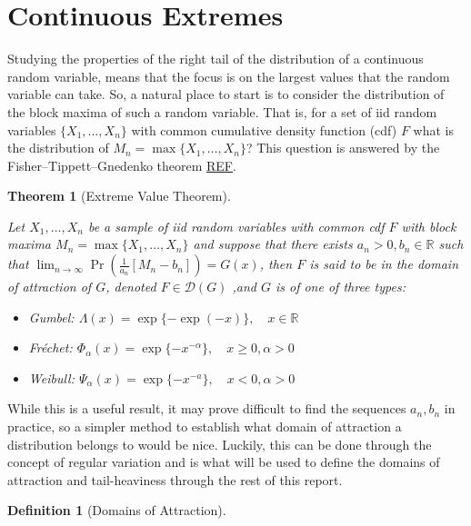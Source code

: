\documentclass[
  10pt,
  a4paper,
]{scrreprt}
\providecommand{\tightlist}{%
  \setlength{\itemsep}{0pt}\setlength{\parskip}{0pt}}\usepackage{longtable,booktabs,array}
\theoremstyle{definition}
\newtheorem{definition}{Definition}[section]
\theoremstyle{plain}
\newtheorem{theorem}{Theorem}[section]
\theoremstyle{remark}
\begin{document}
{\hypertarget{sec-ce}{%
\section{Continuous Extremes}\label{sec-ce}}

Studying the properties of the right tail of the distribution of a
continuous random variable, means that the focus is on the largest
values that the random variable can take. So, a natural place to start
is to consider the distribution of the block maxima of such a random
variable. That is, for a set of iid random variables
\(\{X_1,\ldots,X_n\}\) with common cumulative density function (cdf)
\(F\) what is the distribution of \(M_n = \max\{X_1,\ldots,X_n\}\)? This
question is answered by the Fisher--Tippett--Gnedenko theorem
\href{or\%20more\%20simply\%20the\%20extreme\%20value\%20theorem}{REF}.

\begin{theorem}[Extreme Value
Theorem]\protect\hypertarget{thm-evt}{}\label{thm-evt}

Let \(X_1,\ldots,X_n\) be a sample of iid random variables with common
cdf \(F\) with block maxima \(M_n = \max\{X_1,\ldots,X_n\}\) and suppose
that there exists \(a_n>0, b_n\in\mathbb R\) such that
\(\lim_{n\rightarrow\infty}\Pr(\frac{1}{a_n}[M_n-b_n]) = G(x)\), then
\(F\) is said to be in the domain of attraction of \(G\), denoted
\(F\in\mathcal D(G)\) ,and \(G\) is of one of three types:

\begin{itemize}
\tightlist
\item
  Gumbel: \(\Lambda(x) = \exp\{-\exp(-x)\},\quad x \in \mathbb R\)
\item
  Fréchet:
  \(\Phi_\alpha(x) = \exp\{-x^{-\alpha}\},\quad x\ge 0,\alpha>0\)
\item
  Weibull: \(\Psi_\alpha(x) = \exp\{-x^{-a}\},\quad x<0,\alpha>0\)
\end{itemize}

\end{theorem}

While this is a useful result, it may prove difficult to find the
sequences \(a_n,b_n\) in practice, so a simpler method to establish what
domain of attraction a distribution belongs to would be nice. Luckily,
this can be done through the concept of regular variation and is what
will be used to define the domains of attraction and tail-heaviness
through the rest of this report.

\begin{definition}[Domains of
Attraction]\protect\hypertarget{def-doa}{}\label{def-doa}


\end{definition}}
\end{document}
